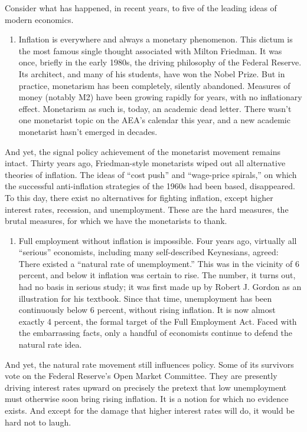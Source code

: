 \documentclass[
]{book}
\providecommand{\tightlist}{%
  \setlength{\itemsep}{0pt}\setlength{\parskip}{0pt}}
\begin{document}
Consider what has happened, in recent years, to five of the leading ideas of modern economics.

\begin{enumerate}
\def\labelenumi{\arabic{enumi}.}
\tightlist
\item
  Inflation is everywhere and always a monetary phenomenon. This dictum is the most famous single thought associated with Milton Friedman. It was once, briefly in the early 1980s, the driving philosophy of the Federal Reserve. Its architect, and many of his students, have won the Nobel Prize. But in practice, monetarism has been completely, silently abandoned. Measures of money (notably M2) have been growing rapidly for years, with no inflationary effect. Monetarism as such is, today, an academic dead letter. There wasn't one monetarist topic on the AEA's calendar this year, and a new academic monetarist hasn't emerged in decades.
\end{enumerate}

And yet, the signal policy achievement of the monetarist movement remains intact. Thirty years ago, Friedman-style monetarists wiped out all alternative theories of inflation. The ideas of ``cost push'' and ``wage-price spirals,'' on which the successful anti-inflation strategies of the 1960s had been based, disappeared. To this day, there exist no alternatives for fighting inflation, except higher interest rates, recession, and unemployment. These are the hard measures, the brutal measures, for which we have the monetarists to thank.

\begin{enumerate}
\def\labelenumi{\arabic{enumi}.}
\setcounter{enumi}{1}
\tightlist
\item
  Full employment without inflation is impossible. Four years ago, virtually all ``serious'' economists, including many self-described Keynesians, agreed: There existed a ``natural rate of unemployment.'' This was in the vicinity of 6 percent, and below it inflation was certain to rise. The number, it turns out, had no basis in serious study; it was first made up by Robert J. Gordon as an illustration for his textbook. Since that time, unemployment has been continuously below 6 percent, without rising inflation. It is now almost exactly 4 percent, the formal target of the Full Employment Act. Faced with the embarrassing facts, only a handful of economists continue to defend the natural rate idea.
\end{enumerate}

And yet, the natural rate movement still influences policy. Some of its survivors vote on the Federal Reserve's Open Market Committee. They are presently driving interest rates upward on precisely the pretext that low unemployment must otherwise soon bring rising inflation. It is a notion for which no evidence exists. And except for the damage that higher interest rates will do, it would be hard not to laugh.
\end{document}
